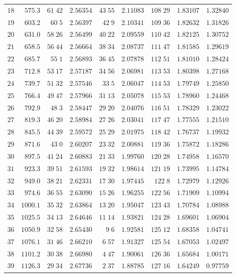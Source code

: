 \begin{center}
\begin{tabular}{r|r|r|r|r|r|r|r|r}
$18$&$575.3$&$61\;42$&$2.56354$&$43\;55$&$2.11083$&$108\;29$&$1.83107$&$1.32840$\\
$19$&$603.2$&$60\;5$&$2.56397$&$42\;9$&$2.10341$&$109\;36$&$1.82632$&$1.31826$\\[2pt]
$20$&$631.0$&$58\;26$&$2.56499$&$40\;22$&$2.09559$&$110\;42$&$1.82125$&$1.30752$\\
$21$&$658.5$&$56\;44$&$2.56664$&$38\;34$&$2.08737$&$111\;47$&$1.81585$&$1.29619$\\
$22$&$685.7$&$55\;1$&$2.56893$&$36\;45$&$2.07878$&$112\;51$&$1.81010$&$1.28424$\\
$23$&$712.8$&$53\;17$&$2.57187$&$34\;56$&$2.06981$&$113\;53$&$1.80398$&$1.27168$\\
$24$&$739.7$&$51\;32$&$2.57546$&$33\;5$&$2.06047$&$114\;53$&$1.79749$&$1.25850$\\[2pt]
$25$&$766.4$&$49\;47$&$2.57966$&$31\;13$&$2.05078$&$115\;53$&$1.78960$&$1.24468$\\
$26$&$792.9$&$48\;3$&$2.58447$&$29\;20$&$2.04076$&$116\;51$&$1.78329$&$1.23022$\\
$27$&$819.3$&$46\;20$&$2.58984$&$27\;26$&$2.03041$&$117\;47$&$1.77555$&$1.21510$\\
$28$&$845.5$&$44\;39$&$2.59572$&$25\;29$&$2.01975$&$118\;42$&$1.76737$&$1.19932$\\
$29$&$871.6$&$43\;0$&$2.60207$&$23\;32$&$2.00881$&$119\;36$&$1.75872$&$1.18286$\\[2pt]
$30$&$897.5$&$41\;24$&$2.60883$&$21\;33$&$1.99760$&$120\;28$&$1.74958$&$1.16570$\\
$31$&$923.3$&$39\;51$&$2.61593$&$19\;32$&$1.98614$&$121\;19$&$1.73995$&$1.14784$\\
$32$&$949.0$&$38\;21$&$2.62331$&$17\;30$&$1.97445$&$122\;8$&$1.72979$&$1.12926$\\
$33$&$974.6$&$36\;55$&$2.63090$&$15\;26$&$1.96255$&$122\;56$&$1.71909$&$1.10994$\\
$34$&$1000.1$&$35\;32$&$2.63864$&$13\;20$&$1.95047$&$123\;43$&$1.70784$&$1.08988$\\[2pt]
$35$&$1025.5$&$34\;13$&$2.64646$&$11\;14$&$1.93821$&$124\;28$&$1.69601$&$1.06904$\\
$36$&$1050.9$&$32\;58$&$2.65430$&$9\;6$&$1.92581$&$125\;12$&$1.68358$&$1.04741$\\
$37$&$1076.1$&$31\;46$&$2.66210$&$6\;57$&$1.91327$&$125\;54$&$1.67053$&$1.02497$\\
$38$&$1101.2$&$30\;38$&$2.66980$&$4\;47$&$1.90061$&$126\;36$&$1.65684$&$1.00171$\\
$39$&$1126.3$&$29\;34$&$2.67736$&$2\;37$&$1.88785$&$127\;16$&$1.64249$&$0.97759$\\[2pt]

\end{tabular}
\end{center}
